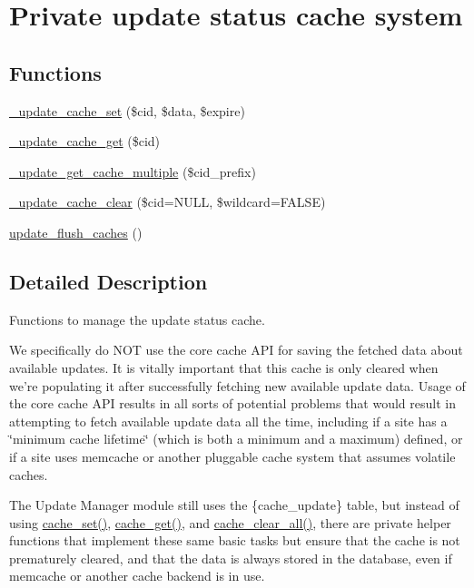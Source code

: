 \hypertarget{group__update__status__cache}{
\section{Private update status cache system}
\label{group__update__status__cache}
}
\subsection*{Functions}
\begin{DoxyCompactItemize}
\item 
\hyperlink{group__update__status__cache_ga3610ff1515f81f28c69b019e5482b77b}{\_\-update\_\-cache\_\-set} (\$cid, \$data, \$expire)
\item 
\hyperlink{group__update__status__cache_ga3f305bb51be069556fa20d692e286f40}{\_\-update\_\-cache\_\-get} (\$cid)
\item 
\hyperlink{group__update__status__cache_ga11c5e3cca6cd9eb1dc328f757448885f}{\_\-update\_\-get\_\-cache\_\-multiple} (\$cid\_\-prefix)
\item 
\hyperlink{group__update__status__cache_ga45fc31b5f9949fc0081ed148a9f378dd}{\_\-update\_\-cache\_\-clear} (\$cid=NULL, \$wildcard=FALSE)
\item 
\hyperlink{group__update__status__cache_ga9c94b82fd5dfa8483267b9af6042bbb2}{update\_\-flush\_\-caches} ()
\end{DoxyCompactItemize}


\subsection{Detailed Description}
Functions to manage the update status cache.

We specifically do NOT use the core cache API for saving the fetched data about available updates. It is vitally important that this cache is only cleared when we're populating it after successfully fetching new available update data. Usage of the core cache API results in all sorts of potential problems that would result in attempting to fetch available update data all the time, including if a site has a \char`\"{}minimum cache lifetime\char`\"{} (which is both a minimum and a maximum) defined, or if a site uses memcache or another pluggable cache system that assumes volatile caches.

The Update Manager module still uses the \{cache\_\-update\} table, but instead of using \hyperlink{includes_2cache_8inc_a48081f36334909f561ef4f538fa640d2}{cache\_\-set()}, \hyperlink{includes_2cache_8inc_a9d873815c28909b61c3a6188b383f8a3}{cache\_\-get()}, and \hyperlink{includes_2cache_8inc_a409b34dd629640d791a11736a9de8125}{cache\_\-clear\_\-all()}, there are private helper functions that implement these same basic tasks but ensure that the cache is not prematurely cleared, and that the data is always stored in the database, even if memcache or another cache backend is in use. 

